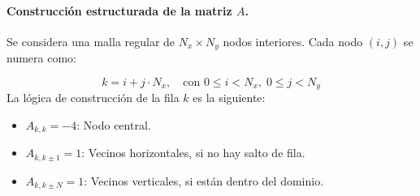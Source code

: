 \documentclass{article}
\begin{document}
\paragraph{Construcción estructurada de la matriz $A$.} Se considera una malla regular de $N_x \times N_y$ nodos interiores. Cada nodo $(i,j)$ se numera como:

$$
k = i + j \cdot N_x, \quad \text{con } 0 \leq i < N_x, \; 0 \leq j < N_y
$$
La lógica de construcción de la fila \( k \) es la siguiente:

\begin{itemize}
    \item \( A_{k,k} = -4 \): Nodo central.
    \item \( A_{k,k\pm 1} = 1 \): Vecinos horizontales, si no hay salto de fila.
    \item \( A_{k,k\pm N} = 1 \): Vecinos verticales, si están dentro del dominio.
\end{itemize}
\end{document}
